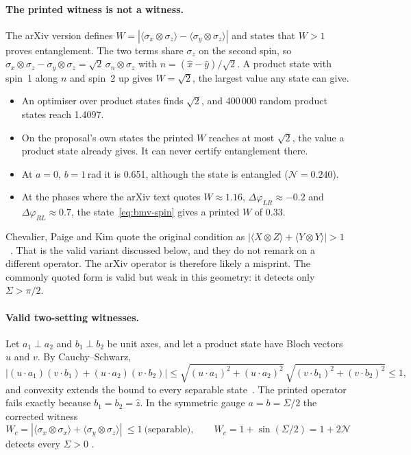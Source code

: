 \paragraph{The printed witness is not a witness.} The arXiv version defines $W=|\langle\sigma_x\otimes\sigma_z\rangle-\langle\sigma_y\otimes\sigma_z\rangle|$
and states that $W>1$ proves entanglement. The two terms share $\sigma_z$ on the second spin, so
$\sigma_x\otimes\sigma_z-\sigma_y\otimes\sigma_z=\sqrt2\,\sigma_n\otimes\sigma_z$ with $n=(\hat x-\hat y)/\sqrt2$. A product state with spin~1
along $n$ and spin~2 up gives $W=\sqrt2$, the largest value any state can give.
\begin{itemize}[nosep]
\item An optimiser over product states finds $\sqrt2$, and 400\,000 random product states reach 1.4097.
\item On the proposal's own states the printed $W$ reaches at most $\sqrt2$, the value a product state already gives. It can never certify
entanglement there.
\item At $a=0$, $b=1$\,rad it is 0.651, although the state is entangled ($\mathcal N=0.240$).
\item At the phases where the arXiv text quotes $W\approx1.16$, $\Delta\varphi_{LR}\approx-0.2$ and $\Delta\varphi_{RL}\approx0.7$, the
state~\eqref{eq:bmv-spin} gives a printed $W$ of 0.33.
\end{itemize}

Chevalier, Paige and Kim quote the original condition as $|\langle X\otimes Z\rangle+\langle Y\otimes Y\rangle|>1$~\cite{chevalier2020}. That
is the valid variant discussed below, and they do not remark on a different operator. The arXiv operator is therefore likely a misprint. The
commonly quoted form is valid but weak in this geometry: it detects only $\Sigma>\pi/2$.

\paragraph{Valid two-setting witnesses.} Let $a_1\perp a_2$ and $b_1\perp b_2$ be unit axes, and let a product state have Bloch vectors $u$
and $v$. By Cauchy--Schwarz,
\begin{equation}\label{eq:bmv-lemma}
|(u\!\cdot\!a_1)(v\!\cdot\!b_1)+(u\!\cdot\!a_2)(v\!\cdot\!b_2)|\le\sqrt{(u\!\cdot\!a_1)^2+(u\!\cdot\!a_2)^2}\,\sqrt{(v\!\cdot\!b_1)^2+(v\!\cdot\!b_2)^2}\le1 ,
\end{equation}
and convexity extends the bound to every separable state~\cite{guhne2009}. The printed operator fails exactly because $b_1=b_2=\hat z$. In
the symmetric gauge $a=b=\Sigma/2$ the corrected witness
\begin{equation}\label{eq:bmv-wc}
W_c=|\langle\sigma_x\otimes\sigma_x\rangle+\langle\sigma_y\otimes\sigma_z\rangle|\ \le1\ \text{(separable)},\qquad W_c=1+\sin(\Sigma/2)=1+2\mathcal N
\end{equation}
detects every $\Sigma>0$ .

